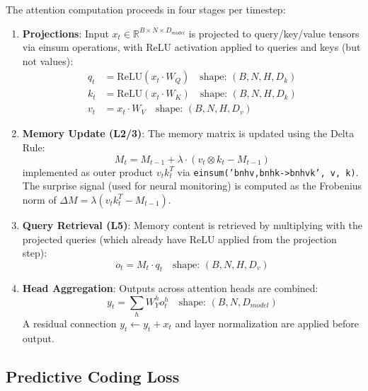 The attention computation proceeds in four stages per timestep:

\begin{enumerate}
	\item \textbf{Projections}: Input $x_t \in \mathbb{R}^{B \times N \times D_{model}}$ is projected to query/key/value tensors via einsum operations, with ReLU activation applied to queries and keys (but not values):
	      \begin{align}
		      q_t & = \text{ReLU}(x_t \cdot W_Q) \quad \text{shape: } (B, N, H, D_k) \\
		      k_t & = \text{ReLU}(x_t \cdot W_K) \quad \text{shape: } (B, N, H, D_k) \\
		      v_t & = x_t \cdot W_V \quad \text{shape: } (B, N, H, D_v)
	      \end{align}

	\item \textbf{Memory Update (L2/3)}: The memory matrix is updated using the Delta Rule:
	      \begin{equation}
		      M_t = M_{t-1} + \lambda \cdot (v_t \otimes k_t - M_{t-1})
	      \end{equation}
	      implemented as outer product $v_t k_t^T$ via \texttt{einsum('bnhv,bnhk->bnhvk', v, k)}. The surprise signal (used for neural monitoring) is computed as the Frobenius norm of $\Delta M = \lambda(v_t k_t^T - M_{t-1})$.

	\item \textbf{Query Retrieval (L5)}: Memory content is retrieved by multiplying with the projected queries (which already have ReLU applied from the projection step):
	      \begin{equation}
		      o_t = M_t \cdot q_t \quad \text{shape: } (B, N, H, D_v)
	      \end{equation}

	\item \textbf{Head Aggregation}: Outputs across attention heads are combined:
	      \begin{equation}
		      y_t = \sum_h W_Y^h o_t^h \quad \text{shape: } (B, N, D_{model})
	      \end{equation}
	      A residual connection $y_t \leftarrow y_t + x_t$ and layer normalization are applied before output.
\end{enumerate}

\subsection{Predictive Coding Loss}

